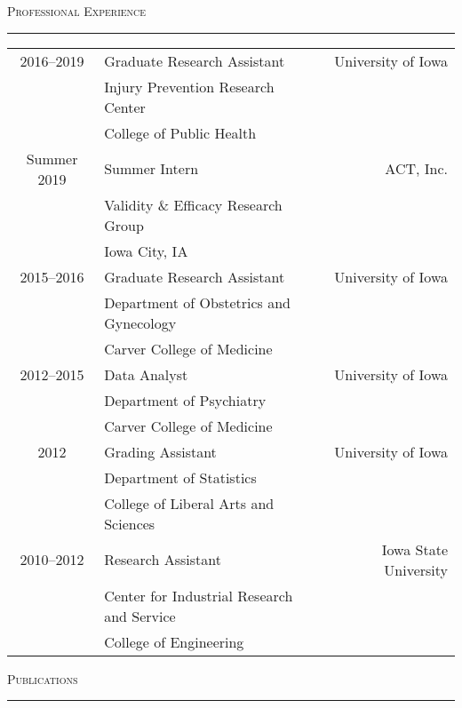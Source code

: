 \documentclass[a4paper]{article}
\begin{document}
\begin{flushleft}
  \Large\textsc{Professional Experience}
  \textcolor{usafagrey}{\rule[0.5\baselineskip]{\textwidth}{0.75pt}}
\end{flushleft}
\vspace{-\baselineskip}

\begin{tabular*}{0.95\textwidth}{@{\extracolsep{\fill}}clr}
  2016--2019 & Graduate Research Assistant & University of Iowa \\
   & Injury Prevention Research Center & \\
   & College of Public Health & \\[3pt]
  Summer 2019 & Summer Intern & ACT, Inc. \\
    & Validity \& Efficacy Research Group & \\
    & Iowa City, IA & \\[3pt]
  2015--2016 & Graduate Research Assistant & University of Iowa \\
   & Department of Obstetrics and Gynecology & \\
   & Carver College of Medicine & \\
  2012--2015 & Data Analyst & University of Iowa \\
   & Department of Psychiatry & \\
   & Carver College of Medicine & \\[3pt]
  2012 & Grading Assistant & University of Iowa \\
   & Department of Statistics & \\
   & College of Liberal Arts and Sciences & \\[3pt]
  2010--2012 & Research Assistant & Iowa State University \\
   & Center for Industrial Research and Service \\
   & College of Engineering &
\end{tabular*}
\vspace{0.25\baselineskip}


\begin{flushleft}
  \Large\textsc{Publications}
  \textcolor{usafagrey}{\rule[0.5\baselineskip]{\textwidth}{0.75pt}}
\end{flushleft}
\vspace{-1.5\baselineskip}
\end{document}
